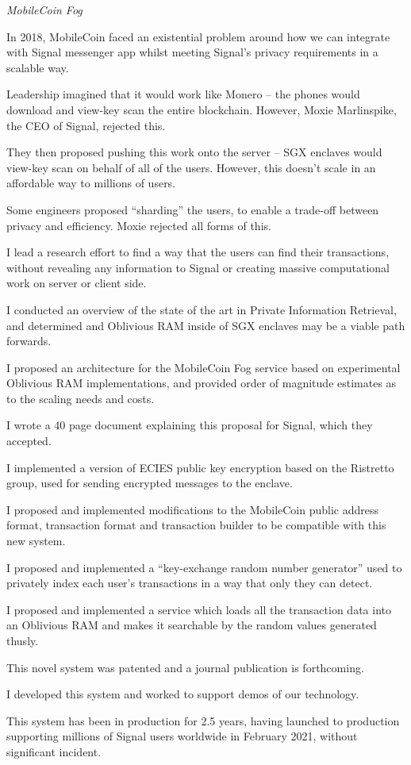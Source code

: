 \documentclass[margin,line]{resume}
\begin{document}
\begin{resume}
    \textsl{MobileCoin Fog}
    \begin{list2}
    \item{In 2018, MobileCoin faced an existential problem around how we can integrate with Signal messenger app whilst meeting Signal's privacy requirements in a scalable way.}
    \item{Leadership imagined that it would work like Monero -- the phones would download and view-key scan the entire blockchain. However, Moxie Marlinspike, the CEO of Signal, rejected this.}
    \item{They then proposed pushing this work onto the server -- SGX enclaves would view-key scan on behalf of all of the users. However, this doesn't scale in an affordable way to millions of users.}
    \item{Some engineers proposed ``sharding'' the users, to enable a trade-off between privacy and efficiency. Moxie rejected all forms of this.}
    \item{I lead a research effort to find a way that the users can find their transactions, without revealing any information to Signal or creating massive computational work on server or client side.}
    \item{I conducted an overview of the state of the art in Private Information Retrieval, and determined and Oblivious RAM inside of SGX enclaves may be a viable path forwards.}
    \item{I proposed an architecture for the MobileCoin Fog service based on experimental Oblivious RAM implementations, and provided order of magnitude estimates as to the scaling needs and costs.}
    \item{I wrote a 40 page document explaining this proposal for Signal, which they accepted.}
    \item{I implemented a version of ECIES public key encryption based on the Ristretto group, used for sending encrypted messages to the enclave.}
    \item{I proposed and implemented modifications to the MobileCoin public address format, transaction format and transaction builder to be compatible with this new system.}
    \item{I proposed and implemented a ``key-exchange random number generator'' used to privately index each user's transactions in a way that only they can detect.}
    \item{I proposed and implemented a service which loads all the transaction data into an Oblivious RAM and makes it searchable by the random values generated thusly.}
    \item{This novel system was patented and a journal publication is forthcoming.}
    \item{I developed this system and worked to support demos of our technology.}
    \item{This system has been in production for 2.5 years, having launched to production supporting millions of Signal users worldwide in February 2021, without significant incident.}
    \end{list2}


\end{resume}
\end{document}
